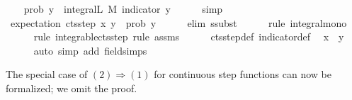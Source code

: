 \documentclass{article}
\theoremstyle{definition}
\begin{document}
\begin{isabellebody}
\isanewline
{}\isamarkupfalse%
\isanewline
\ \ \isamarkupfalse%
\ {\isachardoublequoteopen}prob\ {\isacharbraceleft}{\isachardot}{\isachardot}y{\isacharbraceright}\ {\isacharequal}\ integral\isactrlsup L\ M\ {\isacharparenleft}indicator\ {\isacharbraceleft}{\isachardot}{\isachardot}y{\isacharbraceright}{\isacharparenright}{\isachardoublequoteclose}\isanewline
\ \ \ \ \isamarkupfalse%
\ simp\isanewline
\ \ \isamarkupfalse%
\ {\isachardoublequoteopen}expectation\ {\isacharparenleft}cts{\isacharunderscore}step\ x\ y{\isacharparenright}\ {\isasymle}\ prob\ {\isacharbraceleft}{\isachardot}{\isachardot}y{\isacharbraceright}{\isachardoublequoteclose}\isanewline
\ \ \ \ \isamarkupfalse%
\ {\isacharparenleft}elim\ ssubst{\isacharparenright}\isanewline
\ \ \ \ \isamarkupfalse%
\ {\isacharparenleft}rule\ integral{\isacharunderscore}mono{\isacharparenright}\isanewline
\ \ \ \ \isamarkupfalse%
\ {\isacharparenleft}rule\ integrable{\isacharunderscore}cts{\isacharunderscore}step{\isacharcomma}\ rule\ assms{\isacharparenright}\isanewline
\ \ \ \ \isamarkupfalse%
\ cts{\isacharunderscore}step{\isacharunderscore}def\ indicator{\isacharunderscore}def\ \isamarkupfalse%
\ {\isacharbackquoteopen}x\ {\isacharless}\ y{\isacharbackquoteclose}\isanewline
\ \ \ \ \isamarkupfalse%
\ {\isacharparenleft}auto\ simp\ add{\isacharcolon}\ field{\isacharunderscore}simps{\isacharparenright}\isanewline
{}
\end{isabellebody}

\medskip

The special case of $(2) \Longrightarrow (1)$ for continuous step functions can now be formalized; we omit the proof.

\medskip
\end{document}
